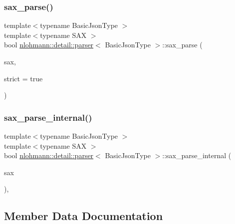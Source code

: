 \subsubsection{\texorpdfstring{sax\+\_\+parse()}{sax\_parse()}}
{\footnotesize\ttfamily template$<$typename Basic\+Json\+Type $>$ \\
template$<$typename S\+AX $>$ \\
bool \hyperlink{classnlohmann_1_1detail_1_1parser}{nlohmann\+::detail\+::parser}$<$ Basic\+Json\+Type $>$\+::sax\+\_\+parse (\begin{DoxyParamCaption}\item[{S\+AX $\ast$}]{sax,  }\item[{const bool}]{strict = {\ttfamily true} }\end{DoxyParamCaption})\hspace{0.3cm}{\ttfamily [inline]}}

\mbox{\label{classnlohmann_1_1detail_1_1parser_ad256ac6f45b213d29096a04b5aa3c587}} 
\subsubsection{\texorpdfstring{sax\+\_\+parse\+\_\+internal()}{sax\_parse\_internal()}}
{\footnotesize\ttfamily template$<$typename Basic\+Json\+Type $>$ \\
template$<$typename S\+AX $>$ \\
bool \hyperlink{classnlohmann_1_1detail_1_1parser}{nlohmann\+::detail\+::parser}$<$ Basic\+Json\+Type $>$\+::sax\+\_\+parse\+\_\+internal (\begin{DoxyParamCaption}\item[{S\+AX $\ast$}]{sax }\end{DoxyParamCaption})\hspace{0.3cm}{\ttfamily [inline]}, {\ttfamily [private]}}



\subsection{Member Data Documentation}
\mbox{\label{classnlohmann_1_1detail_1_1parser_a3de1ea054cfa606e79fa07741f081b5f}} 

